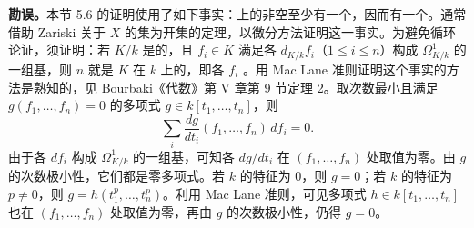 \textbf{勘误。}本节 5.6 的证明使用了如下事实：上的非空至少有一个，因而有一个。通常借助 Zariski 关于 $X$ 的集为开集的定理，以微分方法证明这一事实。为避免循环论证，须证明：若 $K/k$ 是的，且 $f_i\in K$ 满足各 $d_{K/k}f_i$（$1\leq i\leq n$）构成 $\Omega^1_{K/k}$ 的一组基，则 $n$ 就是 $K$ 在 $k$ 上的，即各 $f_i$ 。用 Mac Lane 准则证明这个事实的方法是熟知的，见 Bourbaki《代数》第 V 章第 9 节定理 2。取次数最小且满足 $g(f_1,\ldots,f_n)=0$ 的多项式 $g\in k[t_1,\ldots,t_n]$，则
\[
\sum_i\frac{dg}{dt_i}(f_1,\ldots,f_n)\,df_i=0.
\]
由于各 $df_i$ 构成 $\Omega^1_{K/k}$ 的一组基，可知各 $dg/dt_i$ 在 $(f_1,\ldots,f_n)$ 处取值为零。由 $g$ 的次数极小性，它们都是零多项式。若 $k$ 的特征为 $0$，则 $g=0$；若 $k$ 的特征为 $p\ne0$，则 $g=h(t_1^p,\ldots,t_n^p)$。利用 Mac Lane 准则，可见多项式 $h\in k[t_1,\ldots,t_n]$ 也在 $(f_1,\ldots,f_n)$ 处取值为零，再由 $g$ 的次数极小性，仍得 $g=0$。
